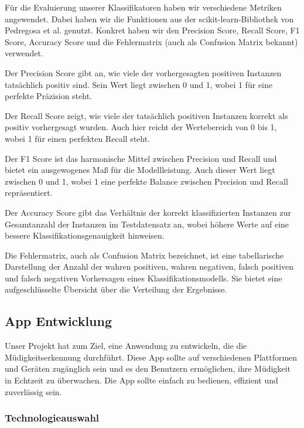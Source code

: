 Für die Evaluierung unserer Klassifikatoren haben wir verschiedene Metriken angewendet. Dabei haben wir die Funktionen aus der scikit-learn-Bibliothek von Pedregosa et al. \cite{PE11} genutzt. Konkret haben wir den Precision Score, Recall Score, F1 Score, Accuracy Score und die Fehlermatrix (auch als Confusion Matrix bekannt) verwendet.

Der Precision Score gibt an, wie viele der vorhergesagten positiven Instanzen tatsächlich positiv sind. Sein Wert liegt zwischen 0 und 1, wobei 1 für eine perfekte Präzision steht.

Der Recall Score zeigt, wie viele der tatsächlich positiven Instanzen korrekt als positiv vorhergesagt wurden. Auch hier reicht der Wertebereich von 0 bis 1, wobei 1 für einen perfekten Recall steht.

Der F1 Score ist das harmonische Mittel zwischen Precision und Recall und bietet ein ausgewogenes Maß für die Modellleistung. Auch dieser Wert liegt zwischen 0 und 1, wobei 1 eine perfekte Balance zwischen Precision und Recall repräsentiert.

Der Accuracy Score gibt das Verhältnis der korrekt klassifizierten Instanzen zur Gesamtanzahl der Instanzen im Testdatensatz an, wobei höhere Werte auf eine bessere Klassifikationsgenauigkeit hinweisen.

Die Fehlermatrix, auch als Confusion Matrix bezeichnet, ist eine tabellarische Darstellung der Anzahl der wahren positiven, wahren negativen, falsch positiven und falsch negativen Vorhersagen eines Klassifikationsmodells. Sie bietet eine aufgeschlüsselte Übersicht über die Verteilung der Ergebnisse.

\subsection{App Entwicklung}
\label{ssec:appEntwicklung}
	Unser Projekt hat zum Ziel, eine Anwendung zu entwickeln, die die Müdigkeitserkennung durchführt. Diese App sollte auf verschiedenen Plattformen und Geräten zugänglich sein und es den Benutzern ermöglichen, ihre Müdigkeit in Echtzeit zu überwachen. Die App sollte einfach zu bedienen, effizient und zuverlässig sein. 
	
	\subsubsection{Technologieauswahl}
	\label{sssec:technologie}
		
